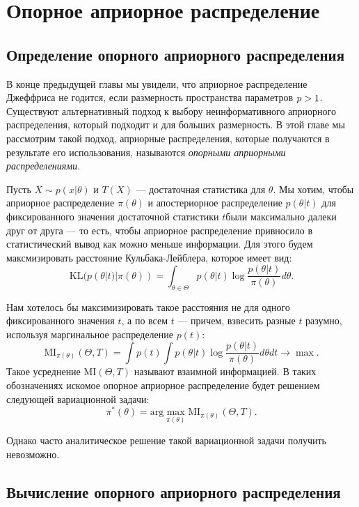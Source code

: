 \section{Опорное априорное распределение}

\subsection{Определение опорного априорного распределения}

В конце предыдущей главы мы увидели, что априорное распределение Джеффриса не годится, если размерность пространства параметров $p > 1$.
Существуют альтернативный подход к выбору неинформативного априорного распределения, который подходит и для больших размерность.
В этой главе мы рассмотрим такой подход, априорные распределения, которые получаются в результате его использования, называются
\emph{опорными априорными распределениями}.

Пусть $X \sim p(x | \theta)$ и $T(X)$ --- достаточная статистика для $\theta$.
Мы хотим, чтобы априорное распределение $\pi(\theta)$ и апостериорное распределение $p(\theta | t)$ для фиксированного значения достаточной статистики $t$были максимально далеки друг от друга --- то есть,
чтобы априорное распределение привносило в статистический вывод как можно меньше информации.
Для этого будем максмизировать расстояние Кульбака-Лейблера, которое имеет вид:
\[
\mathrm{KL}(p(\theta | t) | \pi(\theta)) = \int_{\theta \in \Theta} p(\theta | t) \log \frac{p(\theta | t)}{\pi(\theta)} d\theta.
\]

Нам хотелось бы максимизировать такое расстояния не для одного фиксированного значения $t$, а по всем $t$ --- причем, взвесить разные $t$ разумно,
используя маргинальное распределение $p(t)$:
\[
\mathrm{MI}_{\pi(\theta)}(\Theta, T) = \int p(t) \int p(\theta | t) \log \frac{p(\theta | t)}{\pi(\theta)} d\theta dt \rightarrow \max.
\]
Такое усреднение $\mathrm{MI}(\Theta, T)$ называют взаимной информацией.
В таких обозначениях искомое опорное априорное распределение будет решением следующей вариационной задачи:
\[
\pi^*(\theta) = \mathrm{arg} \max_{\pi(\theta)} \mathrm{MI}_{\pi(\theta)}(\Theta, T).
\]

Однако часто аналитическое решение такой вариационной задачи получить невозможно.

\subsection{Вычисление опорного априорного распределения}

